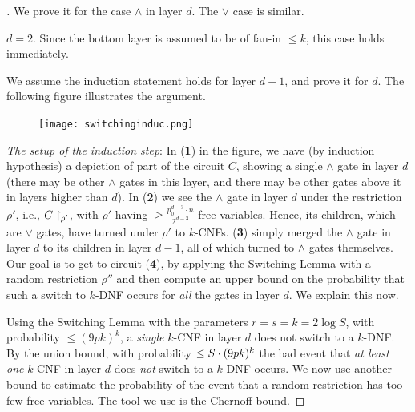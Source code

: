 \begin{proof}[]
We prove it for the case $\land$ in layer $d$. The $\lor$ case is similar.  

\Base $d = 2$. Since the bottom layer is assumed to be of fan-in $\leq k$,  
this case holds immediately.  

\Induction   
We assume the induction statement holds for layer $d-1$, and prove it for $d$. The following figure illustrates the argument. 




\begin{figure}[H]\label{fig:depth-reduction-use}
    \begin{center}
    \texttt{[image: switchinginduc.png]}
    \end{center}
\end{figure}


\textit{The setup of the induction step}: In (\textbf{1}) in the figure,  we have (by induction hypothesis) a depiction of part of the circuit $C$, showing a single $\land$ gate in layer $d$ (there  may be other $\land$ gates in this layer, and there may be other gates above it in layers higher than $d$). 
In (\textbf{2}) we see the $\land$ gate in layer $d$ under the restriction $\rho'$, i.e., $C\upharpoonright_{\rho'}$, with $\rho'$ having $\geq \frac{p_0^{d-3} \cdot n}{2^{d-3}}$ free variables. Hence, its children, which are $\lor$ gates, have turned under $\rho'$ to  $k$-CNFs.
 (\textbf{3}) simply merged the $\land$ gate in layer $d$ to its children in layer $d-1$, all of which turned to $\land$ gates themselves. 
Our goal is to get to circuit (\textbf{4}), by applying the Switching Lemma with a random restriction $\rho''$ and then compute an upper bound on the probability that such a switch to $k$-DNF occurs for \emph{all} the gates in layer $d$. We explain this now.


\smallskip 



Using the Switching Lemma with the parameters \( r = s = k = 2 \log S \), with probability \( \leq (9pk)^k \), a \emph{single} $k$-CNF in layer \( d \) does not switch to a $k$-DNF.
By the union bound, with probability \( \leq S\cdot(9pk)^k \) the bad event that \emph{at least one} $k$-CNF in layer \( d \) does \emph{not} switch to a $k$-DNF occurs.
We now use another bound to estimate the probability of the event that a random restriction has too few free variables. The tool we use is the Chernoff bound.



\end{proof}
